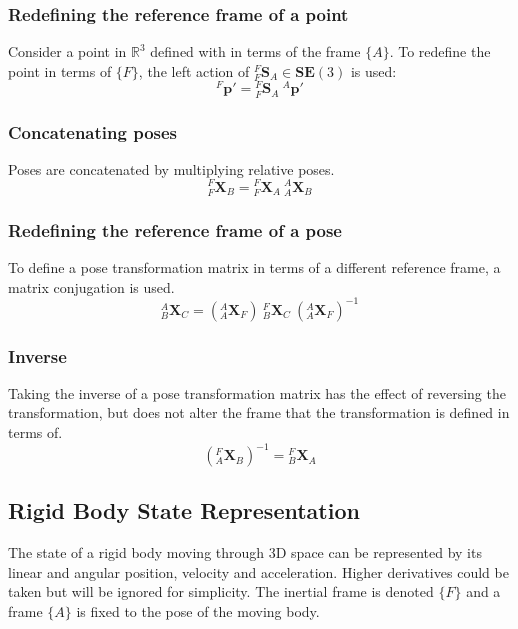		\subsubsection{Redefining the reference frame of a point}
		Consider a point in $\mathbb{R}^3$ defined with in terms of the frame $\{A\}$. To redefine the point in terms of $\{F\}$, the left action of ${^{F}_{F}\mathbf{S}^{}_{A}} \in \mathbf{SE}(3)$ is used:
		\begin{equation}
			^{F}\mathbf{p'} = {^{F}_{F}\mathbf{S}^{}_{A}}\:^{A}\mathbf{p'}
		\end{equation}
		
		\subsubsection{Concatenating poses}
		Poses are concatenated by multiplying relative poses.
		\begin{equation}
			{^{F}_{F}\mathbf{X}^{}_{B}} = {^{F}_{F}\mathbf{X}^{}_{A}}\:{^{A}_{A}\mathbf{X}^{}_{B}}
		\end{equation}
		
		\subsubsection{Redefining the reference frame of a pose}
		To define a pose transformation matrix in terms of a different reference frame, a matrix conjugation is used.
		\begin{equation}
			{^{A}_{B}\mathbf{X}^{}_{C}} = ({^{A}_{A}\mathbf{X}^{}_{F}})\:{^{F}_{B}\mathbf{X}^{}_{C}}\:({^{A}_{A}\mathbf{X}^{}_{F}})^{-1}
		\end{equation}

		\subsubsection{Inverse}
		Taking the inverse of a pose transformation matrix has the effect of reversing the transformation, but does not alter the frame that the transformation is defined in terms of.
		\begin{equation}
			({^{F}_{A}\mathbf{X}^{}_{B}})^{-1} = {^{F}_{B}\mathbf{X}^{}_{A}}
		\end{equation}
	
	\subsection{Rigid Body State Representation} \label{state rep}
		The state of a rigid body moving through 3D space can be represented by its linear and angular position, velocity and acceleration. Higher derivatives could be taken but will be ignored for simplicity.
		The inertial frame is denoted $\{F\}$ and a frame $\{A\}$ is fixed to the pose of the moving body.
		
